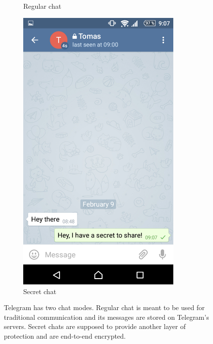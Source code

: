\documentclass[thesis=M,english]{FITthesis}[2012/10/20]
\begin{document}
\begin{figure}[htb]
\begin{subfigure}[b]{0.4\textwidth}
		\caption{Regular chat}
		\label{img:telegram:regular}
	\end{subfigure}
	\hfill
	\begin{subfigure}[b]{0.4\textwidth}
		\centering
		\includegraphics[width=0.9\textwidth]{telegram-secret.png}
		\caption{Secret chat}
		\label{img:telegram:secret}
	\end{subfigure}
	\caption[Telegram chat modes]{Telegram has two chat modes. Regular chat is meant to be used for traditional communication and its messages are stored on Telegram's servers. Secret chats are supposed to provide another layer of protection and are end-to-end encrypted.}
\end{figure}
\end{document}
